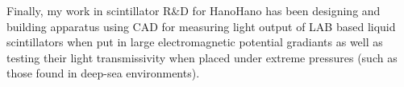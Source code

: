 \documentclass[a4paper,10pt]{article} %
\begin{document}
Finally, my work in scintillator R\&D for HanoHano has been designing and
building apparatus using CAD for measuring light output of LAB based liquid
scintillators when put in large electromagnetic potential gradiants as well as
testing their light transmissivity when placed under extreme pressures (such as
those found in deep-sea environments).

\end{document}
